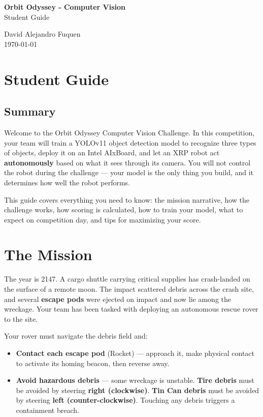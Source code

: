 \documentclass[a4]{article}
\begin{document}
    
    \thispagestyle{fancy}
    
    \begin{center}
        \textbf{\large Orbit Odyssey - Computer Vision} \\
        {Student Guide}
        
        \vspace{0.7em}
    
        David Alejandro Fuquen \\
    
        {\small \today}
    
    \end{center}
    
\section*{Student Guide}

\subsection*{Summary}

Welcome to the Orbit Odyssey Computer Vision Challenge. In this competition, your team will train a YOLOv11 object detection model to recognize three types of objects, deploy it on an Intel AIxBoard, and let an XRP robot act \textbf{autonomously} based on what it sees through its camera. You will not control the robot during the challenge --- your model is the only thing you build, and it determines how well the robot performs.

This guide covers everything you need to know: the mission narrative, how the challenge works, how scoring is calculated, how to train your model, what to expect on competition day, and tips for maximizing your score.

\pagebreak
\section*{The Mission}

The year is 2147. A cargo shuttle carrying critical supplies has crash-landed on the surface of a remote moon. The impact scattered debris across the crash site, and several \textbf{escape pods} were ejected on impact and now lie among the wreckage. Your team has been tasked with deploying an autonomous rescue rover to the site.

Your rover must navigate the debris field and:
\begin{itemize}
    \item \textbf{Contact each escape pod} (Rocket) --- approach it, make physical contact to activate its homing beacon, then reverse away.
    \item \textbf{Avoid hazardous debris} --- some wreckage is unstable. \textbf{Tire debris} must be avoided by steering \textbf{right (clockwise)}. \textbf{Tin Can debris} must be avoided by steering \textbf{left (counter-clockwise)}. Touching any debris triggers a containment breach.
\end{itemize}
\end{document}
